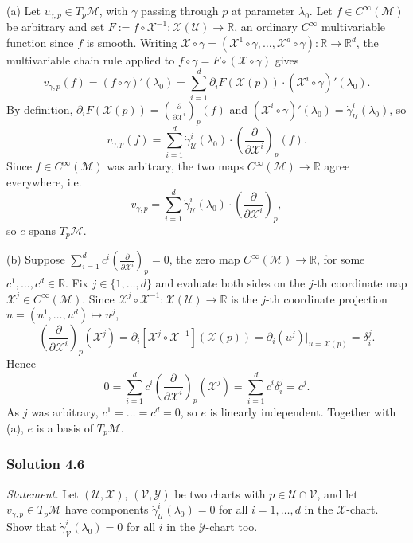 \documentclass[11pt]{article}
\newcommand{\Cinf}{C^\infty(\mathcal M)}
\begin{document}
(a) Let $v_{\gamma,p}\in T_p\mathcal M$, with $\gamma$ passing through $p$
at parameter $\lambda_0$. Let $f\in\Cinf$ be arbitrary and set
$F:=f\circ\mathcal X^{-1}:\mathcal X(\mathcal U)\to\mathbb R$, an ordinary
$C^\infty$ multivariable function since $f$ is smooth. Writing $\mathcal
X\circ\gamma=(\mathcal X^1\circ\gamma,\dots,\mathcal
X^d\circ\gamma):\mathbb R\to\mathbb R^d$, the multivariable chain rule
applied to $f\circ\gamma=F\circ(\mathcal X\circ\gamma)$ gives
\[
v_{\gamma,p}(f) = (f\circ\gamma)'(\lambda_0) = \sum_{i=1}^d
\partial_iF(\mathcal X(p))\cdot(\mathcal X^i\circ\gamma)'(\lambda_0).
\]
By definition, $\partial_iF(\mathcal X(p))=\left(\frac{\partial}{\partial
\mathcal X^i}\right)_p(f)$ and $(\mathcal X^i\circ\gamma)'(\lambda_0)=
\dot\gamma^i_{\mathcal U}(\lambda_0)$, so
\[
v_{\gamma,p}(f) = \sum_{i=1}^d\dot\gamma^i_{\mathcal
U}(\lambda_0)\cdot\left(\frac{\partial}{\partial\mathcal X^i}\right)_p(f).
\]
Since $f\in\Cinf$ was arbitrary, the two maps $\Cinf\to\mathbb R$ agree
everywhere, i.e.\
\[
v_{\gamma,p} = \sum_{i=1}^d\dot\gamma^i_{\mathcal
U}(\lambda_0)\cdot\left(\frac{\partial}{\partial\mathcal X^i}\right)_p,
\]
so $e$ spans $T_p\mathcal M$.

(b) Suppose $\sum_{i=1}^d c^i\left(\frac{\partial}{\partial\mathcal
X^i}\right)_p=0$, the zero map $\Cinf\to\mathbb R$, for some
$c^1,\dots,c^d\in\mathbb R$. Fix $j\in\{1,\dots,d\}$ and evaluate both
sides on the $j$-th coordinate map $\mathcal X^j\in\Cinf$. Since $\mathcal
X^j\circ\mathcal X^{-1}:\mathcal X(\mathcal U)\to\mathbb R$ is the $j$-th
coordinate projection $u=(u^1,\dots,u^d)\mapsto u^j$,
\[
\left(\frac{\partial}{\partial\mathcal X^i}\right)_p(\mathcal X^j) =
\partial_i[\mathcal X^j\circ\mathcal X^{-1}](\mathcal X(p)) =
\partial_i(u^j)\big|_{u=\mathcal X(p)} = \delta^j_i.
\]
Hence
\[
0 = \sum_{i=1}^d c^i\left(\frac{\partial}{\partial\mathcal
X^i}\right)_p(\mathcal X^j) = \sum_{i=1}^d c^i\delta^j_i = c^j.
\]
As $j$ was arbitrary, $c^1=\dots=c^d=0$, so $e$ is linearly independent.
Together with (a), $e$ is a basis of $T_p\mathcal M$.

\subsubsection*{Solution 4.6}

\noindent\textit{Statement.} Let $(\mathcal U,\mathcal X)$, $(\mathcal
V,\mathcal Y)$ be two charts with $p\in\mathcal U\cap\mathcal V$, and let
$v_{\gamma,p}\in T_p\mathcal M$ have components $\dot\gamma^i_{\mathcal
U}(\lambda_0)=0$ for all $i=1,\dots,d$ in the $\mathcal X$-chart. Show that
$\dot\gamma^i_{\mathcal V}(\lambda_0)=0$ for all $i$ in the $\mathcal
Y$-chart too.
\end{document}

